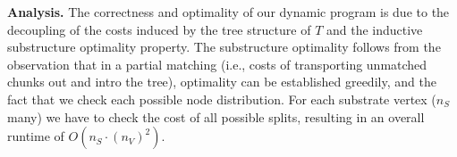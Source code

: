 \documentclass[9pt]{sigcomm-alternate}
\newcommand{\SubstrateNodes}{\ensuremath{V_S}}
\newcommand{\SubstrateNode}{\ensuremath{v}}
\newcommand{\Opt}{\ensuremath{Opt}}
\newcommand{\Uplink}{\ensuremath{\textsc{uplink}}}
\newcommand{\ChunkCount}{\ensuremath{\textsc{cis}}}
\newcommand{\capacity}{\emph{cap}}
\newcommand{\Tree}{\ensuremath{T}}
\newcommand{\CostTrans}{\ensuremath{b_1}}
\newcommand{\CostCom}{\ensuremath{b_2}}
\newcommand{\Vms}{\ensuremath{n_V}}
\begin{document}

\textbf{Analysis.}
The correctness and optimality of our dynamic program 
is due to the decoupling of the costs induced by the tree
structure of $\Tree$ and the inductive substructure
optimality property. 
The substructure optimality follows from the observation that 
in a partial matching (i.e., costs of transporting unmatched
chunks out and intro the tree), 
optimality can be established greedily, and the fact
 that we check each possible node distribution. 
For each substrate vertex ($n_S$ many) we have 
to check the cost of all possible splits, 
resulting in an overall runtime of $O(n_S \cdot (n_V)^2)$.
\end{document}
